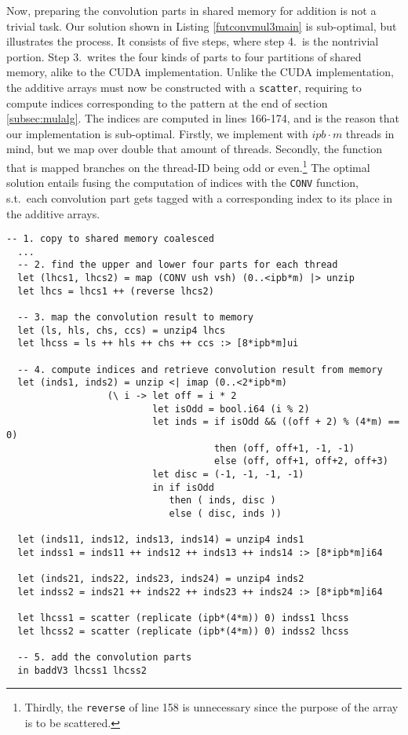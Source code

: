 Now, preparing the convolution parts in shared memory for addition is not a
trivial task. Our solution shown in Listing \ref{futconvmul3main} is
sub-optimal, but illustrates the process. It consists of five steps, where step
4.\ is the nontrivial portion. Step 3.\ writes the four kinds of parts to four
partitions of shared memory, alike to the CUDA implementation. Unlike the CUDA
implementation, the additive arrays must now be constructed with a
\texttt{scatter}, requiring to compute indices corresponding to the pattern at
the end of section \ref{subsec:mulalg}. The indices are computed in lines
166-174, and is the reason that our implementation is sub-optimal. Firstly, we
implement with $\mathit{ipb} \cdot m$ threads in mind, but we map over double that
amount of threads. Secondly, the function that is mapped branches on the
thread-ID being odd or even.\footnote{Thirdly, the \texttt{reverse} of line 158
  is unnecessary since the purpose of the array is to be scattered.} The optimal
solution entails fusing the computation of indices with the \texttt{CONV}
function, s.t.\ each convolution part gets tagged with a corresponding index to
its place in the additive arrays.

\begin{lstlisting}[language=futhark,caption={\footnotesize Futhark
\textit{convmul} \texttt{V3} adding the convolution parts from file \texttt{mul.fut} (slightly edited).},label={futconvmul3main},gobble=2,firstnumber=186]
  -- 1. copy to shared memory coalesced
  ...
  -- 2. find the upper and lower four parts for each thread
  let (lhcs1, lhcs2) = map (CONV ush vsh) (0..<ipb*m) |> unzip
  let lhcs = lhcs1 ++ (reverse lhcs2)

  -- 3. map the convolution result to memory
  let (ls, hls, chs, ccs) = unzip4 lhcs
  let lhcss = ls ++ hls ++ chs ++ ccs :> [8*ipb*m]ui

  -- 4. compute indices and retrieve convolution result from memory
  let (inds1, inds2) = unzip <| imap (0..<2*ipb*m)
                  (\ i -> let off = i * 2
                          let isOdd = bool.i64 (i % 2)
                          let inds = if isOdd && ((off + 2) % (4*m) == 0)
                                     then (off, off+1, -1, -1)
                                     else (off, off+1, off+2, off+3)
                          let disc = (-1, -1, -1, -1)
                          in if isOdd
                             then ( inds, disc )
                             else ( disc, inds ))

  let (inds11, inds12, inds13, inds14) = unzip4 inds1
  let indss1 = inds11 ++ inds12 ++ inds13 ++ inds14 :> [8*ipb*m]i64

  let (inds21, inds22, inds23, inds24) = unzip4 inds2
  let indss2 = inds21 ++ inds22 ++ inds23 ++ inds24 :> [8*ipb*m]i64

  let lhcss1 = scatter (replicate (ipb*(4*m)) 0) indss1 lhcss
  let lhcss2 = scatter (replicate (ipb*(4*m)) 0) indss2 lhcss

  -- 5. add the convolution parts
  in baddV3 lhcss1 lhcss2
\end{lstlisting}


